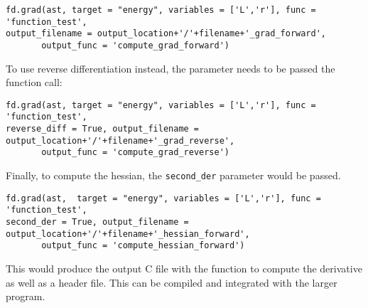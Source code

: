 \documentclass[a4,oneside]{book}
\def\codesize{\small}
\def\code#1{{\codesize\texttt{#1}}}
\begin{document}
\begin{lstlisting}
fd.grad(ast, target = "energy", variables = ['L','r'], func = 'function_test',
output_filename = output_location+'/'+filename+'_grad_forward',
       output_func = 'compute_grad_forward')
\end{lstlisting}

To use reverse differentiation instead, the parameter needs to be passed the function call:
\begin{lstlisting}
fd.grad(ast, target = "energy", variables = ['L','r'], func = 'function_test',
reverse_diff = True, output_filename =  output_location+'/'+filename+'_grad_reverse',
       output_func = 'compute_grad_reverse')
\end{lstlisting}

Finally, to compute the hessian, the \code{second\_der} parameter would be passed.
\begin{lstlisting}
fd.grad(ast,  target = "energy", variables = ['L','r'], func = 'function_test',
second_der = True, output_filename = output_location+'/'+filename+'_hessian_forward',
       output_func = 'compute_hessian_forward')
\end{lstlisting}

This would produce the output C file with the function to compute the derivative as well as a header file. This can be compiled and integrated with the larger program.
\end{document}
